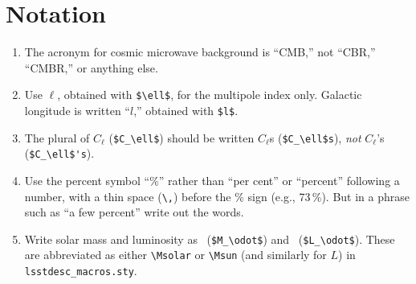 \documentclass[letterpaper,11pt]{article}
\begin{document}
\section{Notation}

\begin{enumerate}

\item The acronym for cosmic microwave background is ``CMB,'' not ``CBR,''
``CMBR,'' or anything else.

\item Use $\ell$, obtained with \verb|$\ell$|, for the multipole index only.
Galactic longitude is written ``$l$,'' obtained with \verb|$l$|.

\item The plural of $C_\ell$ (\verb|$C_\ell$|) should be written $C_\ell$s
(\verb|$C_\ell$s|), {\it not\/} $C_\ell$'s (\verb|$C_\ell$'s|).
 



\item Use the percent symbol ``\%'' rather than ``per cent'' or ``percent''
following a number, with a thin space (\verb|\,|) before the \% sign (e.g., 73\,\%).
But in a phrase such as ``a few percent'' write out the words. 

\item Write solar mass and luminosity as \Msolar\ (\verb|$M_\odot$|) and \Lsolar\ (\verb|$L_\odot$|). These are abbreviated as either \verb|\Msolar| or \verb|\Msun| (and similarly for $L$) in {\tt lsstdesc\_macros.sty}.



\end{enumerate}
\end{document}
